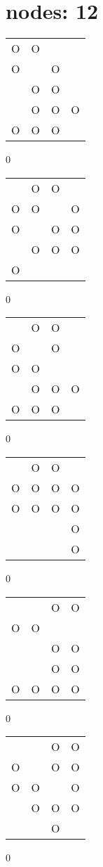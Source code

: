 \section{nodes: 12}
\begin{tabular}{|m{0.2cm}m{0.2cm}m{0.2cm}m{0.2cm}|}\hline
O&O& & \\
O& &O& \\
 &O&O& \\
 &O&O&O\\
O&O&O& \\
\hline\end{tabular}0
\begin{tabular}{|m{0.2cm}m{0.2cm}m{0.2cm}m{0.2cm}|}\hline
 &O&O& \\
O&O& &O\\
O& &O&O\\
 &O&O&O\\
O& & & \\
\hline\end{tabular}0
\begin{tabular}{|m{0.2cm}m{0.2cm}m{0.2cm}m{0.2cm}|}\hline
 &O&O& \\
O& &O& \\
O&O& & \\
 &O&O&O\\
O&O&O& \\
\hline\end{tabular}0
\begin{tabular}{|m{0.2cm}m{0.2cm}m{0.2cm}m{0.2cm}|}\hline
 &O&O& \\
O&O&O&O\\
O&O&O&O\\
 & & &O\\
 & & &O\\
\hline\end{tabular}0
\begin{tabular}{|m{0.2cm}m{0.2cm}m{0.2cm}m{0.2cm}|}\hline
 & &O&O\\
O&O& & \\
 & &O&O\\
 & &O&O\\
O&O&O&O\\
\hline\end{tabular}0
\begin{tabular}{|m{0.2cm}m{0.2cm}m{0.2cm}m{0.2cm}|}\hline
 & &O&O\\
O& &O&O\\
O&O& &O\\
 &O&O&O\\
 & &O& \\
\hline\end{tabular}0

